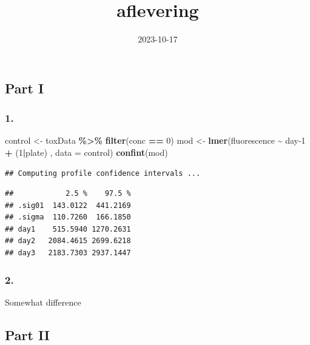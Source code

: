 \documentclass[
]{article}
\title{aflevering}
\author{}
\date{\vspace{-2.5em}2023-10-17}
\newenvironment{Shaded}{\begin{snugshade}}{\end{snugshade}}
\newcommand{\AttributeTok}[1]{\textcolor[rgb]{0.13,0.29,0.53}{#1}}
\newcommand{\DecValTok}[1]{\textcolor[rgb]{0.00,0.00,0.81}{#1}}
\newcommand{\FunctionTok}[1]{\textcolor[rgb]{0.13,0.29,0.53}{\textbf{#1}}}
\newcommand{\NormalTok}[1]{#1}
\newcommand{\OtherTok}[1]{\textcolor[rgb]{0.56,0.35,0.01}{#1}}
\newcommand{\SpecialCharTok}[1]{\textcolor[rgb]{0.81,0.36,0.00}{\textbf{#1}}}
\begin{document}
\maketitle

\hypertarget{part-i}{%
\subsection{Part I}\label{part-i}}

\hypertarget{section}{%
\subsubsection{1.}\label{section}}

\begin{Shaded}
\begin{Highlighting}[]
\NormalTok{control }\OtherTok{\textless{}{-}}\NormalTok{ toxData }\SpecialCharTok{\%\textgreater{}\%} \FunctionTok{filter}\NormalTok{(conc }\SpecialCharTok{==} \DecValTok{0}\NormalTok{)}
\NormalTok{mod }\OtherTok{\textless{}{-}} \FunctionTok{lmer}\NormalTok{(fluorescence }\SpecialCharTok{\textasciitilde{}}\NormalTok{ day}\DecValTok{{-}1} \SpecialCharTok{+}\NormalTok{ (}\DecValTok{1}\SpecialCharTok{|}\NormalTok{plate) , }\AttributeTok{data =}\NormalTok{ control) }
\FunctionTok{confint}\NormalTok{(mod)}
\end{Highlighting}
\end{Shaded}

\begin{verbatim}
## Computing profile confidence intervals ...
\end{verbatim}

\begin{verbatim}
##            2.5 %    97.5 %
## .sig01  143.0122  441.2169
## .sigma  110.7260  166.1850
## day1    515.5940 1270.2631
## day2   2084.4615 2699.6218
## day3   2183.7303 2937.1447
\end{verbatim}

\hypertarget{section-1}{%
\subsubsection{2.}\label{section-1}}

Somewhat difference

\hypertarget{part-ii}{%
\subsection{Part II}\label{part-ii}}
\end{document}
